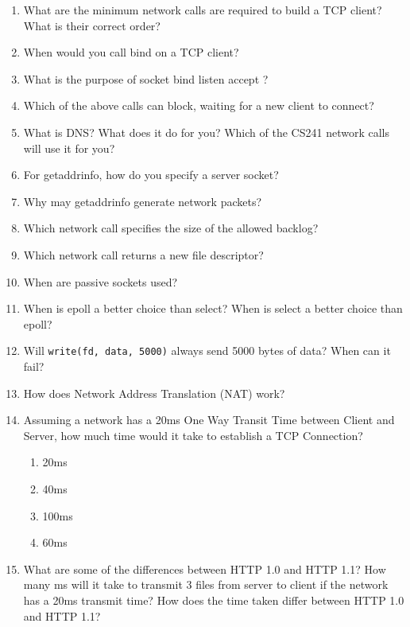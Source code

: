 \begin{enumerate}
\item What are the minimum network calls are required to build a TCP client? What is their correct order?

\item When would you call bind on a TCP client?

\item What is the purpose of socket bind listen accept ?

\item Which of the above calls can block, waiting for a new client to connect?

\item What is DNS? What does it do for you? Which of the CS241 network calls will use it for you?

\item For getaddrinfo, how do you specify a server socket?

\item Why may getaddrinfo generate network packets?

\item Which network call specifies the size of the allowed backlog?

\item Which network call returns a new file descriptor?

\item When are passive sockets used?

\item When is epoll a better choice than select? When is select a better choice than epoll?

\item Will \texttt{write(fd,\ data,\ 5000)} always send 5000 bytes of data? When can it fail?

\item How does Network Address Translation (NAT) work?

\item Assuming a network has a 20ms One Way Transit Time between Client and Server, how much time would it take to establish a TCP Connection?
  \begin{enumerate}
  \item 20ms
  \item 40ms
  \item 100ms
  \item 60ms
  \end{enumerate}

\item What are some of the differences between HTTP 1.0 and HTTP 1.1? How many ms will it take to transmit 3 files from server to client if the network has a 20ms transmit time? How does the time taken differ between HTTP 1.0 and HTTP 1.1?


\end{enumerate}
